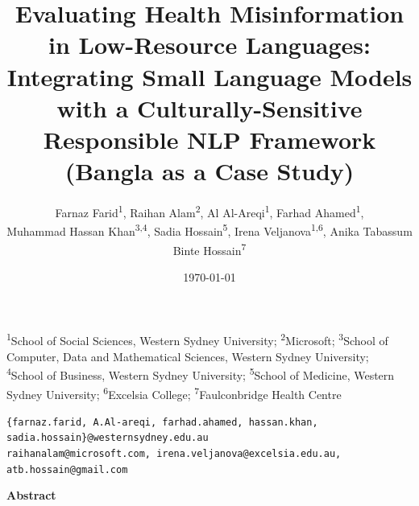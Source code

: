 \documentclass[]{article}
\title{Evaluating Health Misinformation in Low-Resource Languages: Integrating Small Language Models with a Culturally-Sensitive Responsible NLP Framework (Bangla as a Case Study)}
\date{\today} %
\author{}
\date{}
\begin{document}
\maketitle
\vspace{-2cm}
\author{
    \begin{tabular}{c}
        Farnaz Farid\textsuperscript{1}, 
        Raihan Alam\textsuperscript{2}, 
        Al Al-Areqi\textsuperscript{1}, 
        Farhad Ahamed\textsuperscript{1}, \\ 
        Muhammad Hassan Khan\textsuperscript{3,4}, 
        Sadia Hossain\textsuperscript{5}, 
        Irena Veljanova\textsuperscript{1,6}, 
        Anika Tabassum Binte Hossain\textsuperscript{7}
    \end{tabular}
}

\begin{center}
    \small
    \textsuperscript{1}School of Social Sciences, Western Sydney University; 
    \textsuperscript{2}Microsoft; 
    \textsuperscript{3}School of Computer, Data and Mathematical Sciences, Western Sydney University; \\
    \textsuperscript{4}School of Business, Western Sydney University; 
    \textsuperscript{5}School of Medicine, Western Sydney University; 
    \textsuperscript{6}Excelsia College; 
    \textsuperscript{7}Faulconbridge Health Centre
\end{center}
\begin{center}
    \footnotesize
    \texttt{\{farnaz.farid, A.Al-areqi, farhad.ahamed, hassan.khan, sadia.hossain\}@westernsydney.edu.au} \\
    \texttt{raihanalam@microsoft.com, irena.veljanova@excelsia.edu.au, atb.hossain@gmail.com}
\end{center}

\vspace{1cm} %
\textbf{Abstract}
\end{document}
